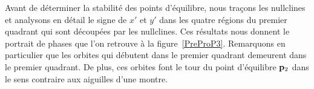 {Avant de déterminer la stabilité des points d'équilibre, nous traçons les
nullclines et analysons en détail le signe de $x'$ et $y'$ dans les quatre
régions du premier quadrant qui sont découpées par les nullclines.
Ces résultats nous donnent le portrait de phases que l'on retrouve à
la figure~\ref{PreProP3}.  Remarquons en
particulier que les orbites qui débutent dans le premier quadrant demeurent
dans le premier quadrant.  De plus, ces orbites font le tour du point
d'équilibre $\mathbf{p}_2$ dans le sens contraire aux aiguilles d'une montre.


}
